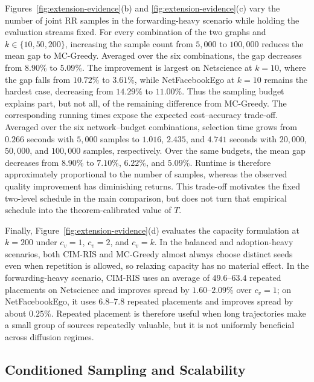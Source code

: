 \documentclass[sigconf,balance=false]{acmart}
\newcommand{\CIMRIS}{\textsc{CIM-RIS}}
\begin{document}
Figures~\ref{fig:extension-evidence}(b) and
\ref{fig:extension-evidence}(c) vary the number of joint RR samples in the
forwarding-heavy scenario while holding the evaluation streams fixed.
For every combination of the two graphs and $k\in\{10,50,200\}$, increasing
the sample count from $5{,}000$ to $100{,}000$ reduces the mean gap to
MC-Greedy. Averaged over the six combinations, the gap decreases from
$8.90\%$ to $5.09\%$. The improvement is largest on Netscience at
$k=10$, where the gap falls from $10.72\%$ to $3.61\%$, while
NetFacebookEgo at $k=10$ remains the hardest case, decreasing from
$14.29\%$ to $11.00\%$. Thus the sampling budget explains part, but not
all, of the remaining difference from MC-Greedy.
The corresponding running times expose the expected cost--accuracy trade-off.
Averaged over the six network--budget combinations, selection time grows from
$0.266$ seconds with $5{,}000$ samples to $1.016$, $2.435$, and $4.741$
seconds with $20{,}000$, $50{,}000$, and $100{,}000$ samples, respectively.
Over the same budgets, the mean gap decreases from $8.90\%$ to $7.10\%$,
$6.22\%$, and $5.09\%$.
Runtime is therefore approximately proportional to the number of samples,
whereas the observed quality improvement has diminishing returns.
This trade-off motivates the fixed two-level schedule in the main comparison,
but does not turn that empirical schedule into the theorem-calibrated value of
$T$.

Finally, Figure~\ref{fig:extension-evidence}(d) evaluates the capacity
formulation at $k=200$ under $c_v=1$, $c_v=2$, and $c_v=k$.
In the balanced and adoption-heavy scenarios, both \CIMRIS{} and
MC-Greedy almost always choose distinct seeds even when repetition is
allowed, so relaxing capacity has no material effect.
In the forwarding-heavy scenario, \CIMRIS{} uses an average of
$49.6$--$63.4$ repeated placements on Netscience and improves spread by
$1.60$--$2.09\%$ over $c_v=1$; on NetFacebookEgo, it uses
$6.8$--$7.8$ repeated placements and improves spread by about $0.25\%$.
Repeated placement is therefore useful when long trajectories make a
small group of sources repeatedly valuable, but it is not uniformly
beneficial across diffusion regimes.

\FloatBarrier

\subsection{Conditioned Sampling and Scalability}
\label{sec:exp-efficiency}
\end{document}
